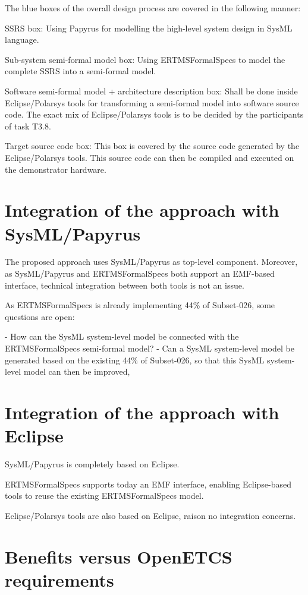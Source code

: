 The blue boxes of the overall design process are covered in the following manner:

SSRS box: Using Papyrus for modelling the high-level system design in SysML language. 

Sub-system semi-formal model box: Using ERTMSFormalSpecs to model the complete SSRS into a semi-formal model.

Software semi-formal model + architecture description box: Shall be done inside Eclipse/Polarsys tools for transforming a semi-formal model 
into software source code. The exact mix of Eclipse/Polarsys tools is to be decided by the participants of task T3.8. 

Target source code box: This box is covered by the source code generated by the Eclipse/Polarsys tools. This source code can then be compiled and executed on the demonstrator hardware. 

\section{Integration of the approach with SysML/Papyrus}

The proposed approach uses SysML/Papyrus as top-level component. Moreover, as SysML/Papyrus and ERTMSFormalSpecs both support an EMF-based interface, 
technical integration between both tools is not an issue.

As ERTMSFormalSpecs is already implementing 44\% of Subset-026, some questions are open:

- How can the SysML system-level model be connected with the ERTMSFormalSpecs semi-formal model? 
- Can a SysML system-level model be generated based on the existing 44\% of Subset-026, so that this SysML system-level model 
can then be improved, 

\section{Integration of the approach with Eclipse}

SysML/Papyrus is completely based on Eclipse.

ERTMSFormalSpecs supports today an EMF interface, enabling Eclipse-based tools to reuse the existing ERTMSFormalSpecs model. 

Eclipse/Polarsys tools are also based on Eclipse, raison no integration concerns.

\section{Benefits versus OpenETCS requirements}

